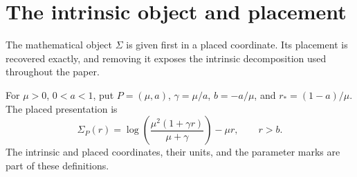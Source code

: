 \section{The intrinsic object and placement}
\label{final:root}

The mathematical object $\Sigma$ is given first in a placed coordinate.
Its placement is recovered exactly, and removing it exposes the
intrinsic decomposition used throughout the paper.

\begin{definition}
\label{final:C0}
For $\mu>0$, $0<a<1$, put $P=(\mu,a)$, $\gamma=\mu/a$,
$b=-a/\mu$, and $r_*=(1-a)/\mu$. The placed presentation is
\[
 \Sigma_P(r)=\log\!\left(\frac{\mu^2(1+\gamma r)}{\mu+\gamma}\right)-\mu r,
 \qquad r>b.
\]
The intrinsic and placed coordinates, their units, and the parameter
marks are part of these definitions.
\end{definition}

